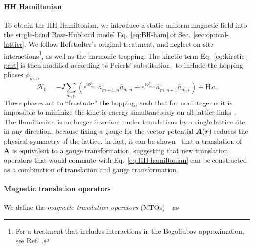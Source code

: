 \paragraph{HH Hamiltonian}
To obtain the HH Hamiltonian, we introduce a static uniform magnetic
field into the single-band Bose-Hubbard model Eq.~\eqref{eq:BH-ham} of
Sec.~\ref{sec:optical-lattice}. We follow Hofstadter's original
treatment, and neglect on-site interactions\footnote{For a treatment
  that includes interactions in the Bogoliubov approximation, see
  Ref.~\cite{PhysRevA.83.013612}.}, as well as the harmonic
trapping. The kinetic term Eq.~\eqref{eq:kinetic-part} is then
modified according to Peierls' substitution~\cite{peierls1933} to
include the hopping phases $\phi_{m,n}$
%
\begin{equation}\label{eq:HH-hamiltonian}
  \mathcal{H}_0 = -J \sum_{m,n} \left(e^{i\phi^x_{m,n}}\hat{a}^{\dagger}_{m+1,n}\hat{a}_{m,n} + e^{i\phi^{y}_{m,n}}\hat{a}^{\dagger}_{m,n+1}\hat{a}_{m,n}\right) + \text{H.c.}
\end{equation}
% 
These phases act to ``frustrate'' the hopping, such that for
noninteger $\alpha$ it is impossible to minimize the kinetic energy
simultaneously on all lattice links~\cite{moessner2001}. The
Hamiltonian is no longer invariant under translations by a single
lattice site in any direction, because fixing a gauge for the vector
potential $\bm{A}(\bm{r})$ reduces the physical symmetry of the
lattice. In fact, it can be shown~\cite{jain2007composite} that a
translation of $\bm{A}$ is equivalent to a gauge transformation,
suggesting that new translation operators that would commute with
Eq.~\eqref{eq:HH-hamiltonian} can be constructed as a combination of
translation and gauge transformation.


\paragraph{Magnetic translation operators}
We define the \textit{magnetic translation operators} (MTOs)
~\cite{zak1964group,zak1964representations} as

